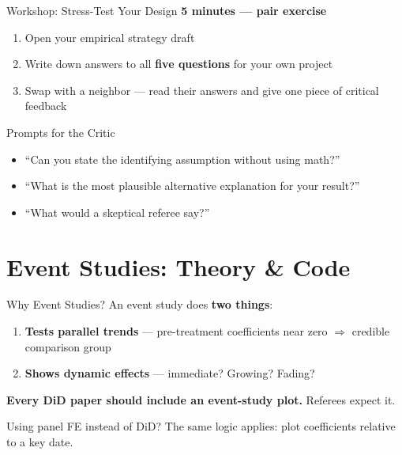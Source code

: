 \begin{frame}{Workshop: Stress-Test Your Design}
  \textbf{\textcolor{usfgreen}{5 minutes --- pair exercise}}

  \vspace{8pt}

  \begin{enumerate}
    \item Open your empirical strategy draft
    \item Write down answers to all \textbf{five questions} for your own project
    \item Swap with a neighbor --- read their answers and give one piece of critical feedback
  \end{enumerate}

  \vspace{8pt}

  \begin{block}{Prompts for the Critic}
    \begin{itemize}
      \item ``Can you state the identifying assumption without using math?''
      \item ``What is the most plausible alternative explanation for your result?''
      \item ``What would a skeptical referee say?''
    \end{itemize}
  \end{block}
\end{frame}


\section{Event Studies: Theory \& Code}

\begin{frame}{Why Event Studies?}
  An event study does \textbf{two things}:

  \vspace{8pt}

  \begin{enumerate}
    \item \textbf{Tests parallel trends} --- pre-treatment coefficients near zero $\Rightarrow$ credible comparison group
    \item \textbf{Shows dynamic effects} --- immediate? Growing? Fading?
  \end{enumerate}

  \vspace{8pt}

  \textbf{Every DiD paper should include an event-study plot.} Referees expect it.

  \vspace{8pt}

  Using panel FE instead of DiD? The same logic applies: plot coefficients relative to a key date.
\end{frame}

